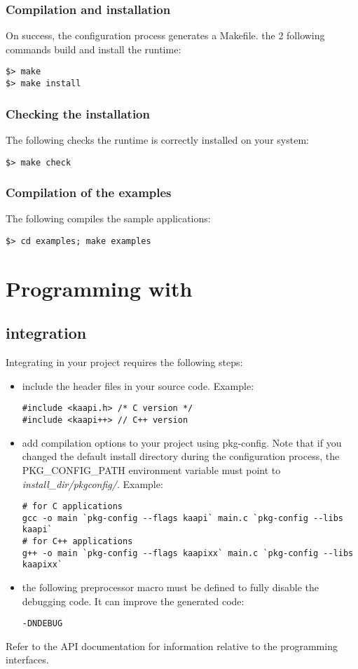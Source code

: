 \subsubsection{Compilation and installation}
On success, the configuration process generates a Makefile. the 2 following
commands build and install the \kaapi runtime:
\begin{verbatim}
$> make
$> make install
\end{verbatim}

\subsubsection{Checking the installation}
The following checks the runtime is correctly installed on your system:
\begin{verbatim}
$> make check
\end{verbatim}

\subsubsection{Compilation of the examples}
The following compiles the sample applications:
\begin{verbatim}
$> cd examples; make examples
\end{verbatim}

\section{Programming with \kaapi}
\subsection{\kaapi integration}
Integrating \kaapi in your project requires the following steps:
\begin{itemize}
\item include the header files in your source code. Example:
\begin{verbatim} 
#include <kaapi.h> /* C version */
#include <kaapi++> // C++ version
\end{verbatim}
\item add compilation options to your project using pkg-config.
Note that if you changed the default install directory during
the configuration process, the PKG\_CONFIG\_PATH environment
variable must point to \textit{install\_dir/pkgconfig/}.
Example:
\begin{verbatim} 
# for C applications
gcc -o main `pkg-config --flags kaapi` main.c `pkg-config --libs kaapi`
# for C++ applications
g++ -o main `pkg-config --flags kaapixx` main.c `pkg-config --libs kaapixx`
\end{verbatim}
\item the following preprocessor macro must be defined to fully disable
the debugging code. It can improve the generated code:
\begin{verbatim}
-DNDEBUG
\end{verbatim}



\end{itemize}
Refer to the API documentation for information relative
to the \kaapi programming interfaces.

